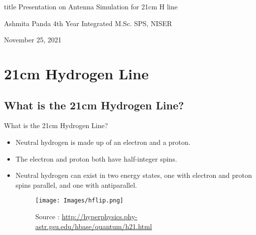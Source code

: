 \documentclass[12pt, dvipsnames]{beamer}
\begin{document}
\begin{frame}
    \vspace{\fill}
    \begin{beamercolorbox}[sep=8pt, center,shadow=true, rounded=true]{title}
        Presentation on \linebreak
        Antenna Simulation for 21cm H line
    \end{beamercolorbox}
    \begin{center}
      \footnotesize{
        Ashmita Panda  \linebreak
        4th Year Integrated M.Sc.\linebreak
        SPS, NISER \linebreak

        November 25, 2021 \linebreak
      }
    \end{center}
\end{frame}

%
\section{21cm Hydrogen Line}
\subsection{What is the 21cm Hydrogen Line?}
\begin{frame}{What is the 21cm Hydrogen Line?}
    \begin{itemize}
        \item Neutral hydrogen is made up of an electron and a proton.
        \item The electron and proton both have half-integer spins. 
        \item Neutral hydrogen can exist in two energy states, one with electron and proton spins parallel, and one with antiparallel.
        \begin{figure}
            \centering
            \texttt{[image: Images/hflip.png]}
            \caption{Source : \url{http://hyperphysics.phy-astr.gsu.edu/hbase/quantum/h21.html}}
        \end{figure}
    \end{itemize}
\end{frame}
\end{document}
